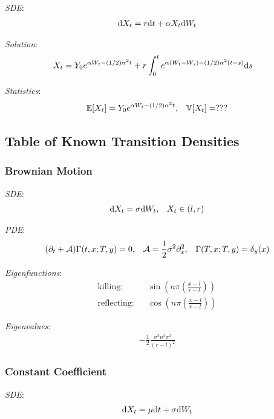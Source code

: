 \documentclass[12pt]{article}
\begin{document}
\textit{SDE}:
\begin{align*}
    \mathrm{d} X_t = r \mathrm{d} t + \alpha X_t \mathrm{d} W_t
\end{align*}

\textit{Solution}:
\begin{align*}
    X_t &= Y_0 e^{\alpha W_t - (1/2)\alpha^2 t} + r \int_{0}^{t} e^{\alpha(W_t-W_s)-(1/2)\alpha^2(t-s)} \mathrm{d} s
\end{align*}

\textit{Statistics}:
\begin{align*}
    \mathbb{E}[X_t] = Y_0 e^{\alpha W_t - (1/2) \alpha^2 t}
    ,&&
    \mathbb{V}[X_t] = ??? 
\end{align*}


\subsection{Table of Known Transition Densities}
\subsubsection{Brownian Motion}
\textit{SDE}:
\begin{align*}
    \mathrm{d} X_t = \sigma \mathrm{d} W_t, && X_t\in(l,r)
\end{align*}

\textit{PDE}:
\begin{align*}
    (\partial_t + \mathcal{A}) \Gamma(t,x;T,y) = 0,&& \mathcal{A} = \frac{1}{2}\sigma^2 \partial_x^2 ,&& \Gamma(T,x;T,y) = \delta_y(x)
\end{align*}

\textit{Eigenfunctions}:
\begin{align*}
    \text{killing:} &&  \sin \left( n \pi \left( \frac{x-l}{r-l} \right) \right)\\
    \text{reflecting:} &&  \cos \left( n \pi \left( \frac{x-l}{r-l} \right) \right)
\end{align*}

\textit{Eigenvalues}:
\begin{align*}
    - \frac{1}{2} \frac{\sigma^2 n^2 \pi^2}{(r-l)^2}
\end{align*}


\subsubsection{Constant Coefficient}
\textit{SDE}:
\begin{align*}
    \mathrm{d} X_t = \mu \mathrm{d} t + \sigma \mathrm{d} W_t
\end{align*}
\end{document}
